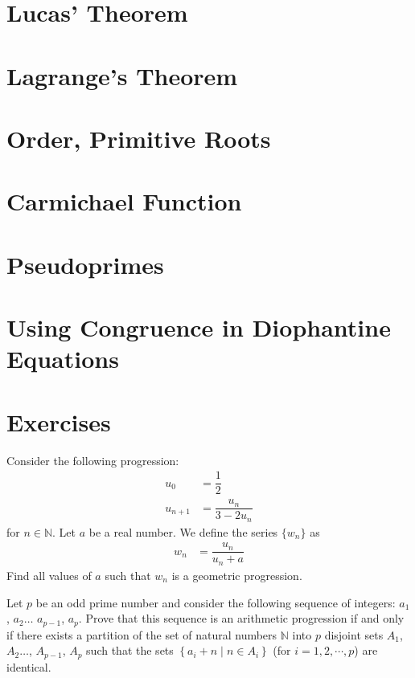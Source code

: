 \section{Lucas' Theorem}
	
\section{Lagrange's Theorem}
	
\section{Order, Primitive Roots} \label{sec:order}
	
\section{Carmichael Function}
	
\section{Pseudoprimes} \label{sec:pseudoprimes}
	
\section{Using Congruence in Diophantine Equations}
	

	\newpage
	\section{Exercises}

\begin{problem} %
	Consider the following progression:
		\begin{align*}
			u_0 &= \dfrac{1}{2}\\
			u_{n+1} &= \dfrac{u_n}{3-2u_n}
		\end{align*}
	for $n\in\mathbb{N}$. Let $a$ be a real number. We define the series $\{w_n\}$ as
		\begin{align*}
			w_n &= \dfrac{u_n}{u_n + a}
		\end{align*}
	Find all values of $a$ such that $w_n$ is a geometric progression.
\end{problem}

\begin{problem} %
	Let $p$ be an odd prime number and consider the following sequence of integers: $a_1$, $a_2\ldots$ $a_{p-1}$, $a_p$. Prove that this sequence is an arithmetic progression if and only if there exists a partition of the set of natural numbers $\mathbb{N}$ into $p$ disjoint sets $A_1$, $A_2\ldots$, $A_{p-1}$, $A_p$ such that the sets $\left\{ a_i+n\mid n\in A_i\right\}$ (for $i=1, 2,\cdots, p$) are identical.
\end{problem}

